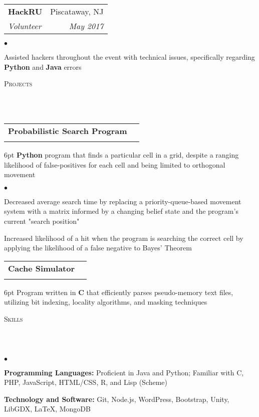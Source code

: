 \documentclass[12pt]{article}
\makeatletter
\newcommand{\lineunder}{
	\vspace*{-8pt} \\ 
	\hspace*{-18pt} 
	\hrulefill \\
}
\newcommand{\header}[1]{
	\vspace*{2pt}
	{\hspace*{-14pt}\vspace*{6pt} \textsc{#1}} 
	\vspace*{-6pt} 
	\lineunder
}
\newenvironment{achievements}{
  \begin{list}{$\bullet$}{
  	\topsep 0pt \itemsep -4pt}}
  	{\vspace*{2pt}\end{list}
}
\newcommand{\subheading}[4]{
 	\vspace{5pt}
    	\begin{tabular*}{1.01\textwidth}{l@{\extracolsep{\fill}}r}
      		\textbf{#1} & #2 \\
      		\textit{\small#3} & \textit{\small #4} \\
    	\end{tabular*}\vspace{-5pt}
}
\makeatother
\begin{document}
\subheading
	{HackRU}{Piscataway, NJ}
	{Volunteer}{May 2017}
	\begin{achievements}
		\item Assisted hackers throughout the event with technical issues, specifically regarding \textbf{Python} and \textbf{Java} errors
	\end{achievements}


\header{Projects}

\subheading{Probabilistic Search Program}{}{}{}
	\vspace{-15pt}	
	\begin{adjustwidth}{6pt}{}
	\textbf{Python} program that finds a particular cell in a grid, despite a ranging likelihood of false-positives for each cell and being limited to orthogonal movement
	\end{adjustwidth}
	\begin{achievements}
		\item Decreased average search time by replacing a priority-queue-based movement system with a matrix informed by a changing belief state and the program's current "search position"
		\item Increased likelihood of a hit when the program is searching the correct cell by applying the likelihood of a false negative to Bayes' Theorem
	\end{achievements}
\subheading{Cache Simulator}{}{}{}
	\vspace{-15pt}
	\begin{adjustwidth}{6pt}{}
	Program written in \textbf{C} that efficiently parses pseudo-memory text files, utilizing bit indexing, locality algorithms, and masking techniques
	\end{adjustwidth}
\vspace*{4pt}
	
\header{Skills}
	\begin{achievements}
		\item{\bf Programming Languages:} Proficient in Java and Python; Familiar with C, PHP, JavaScript, HTML/CSS, R, and Lisp (Scheme)
		\item{\bf Technology and Software:} Git, Node.js, WordPress, Bootstrap, Unity, LibGDX, \LaTeX, MongoDB
	\end{achievements}
\end{document}

